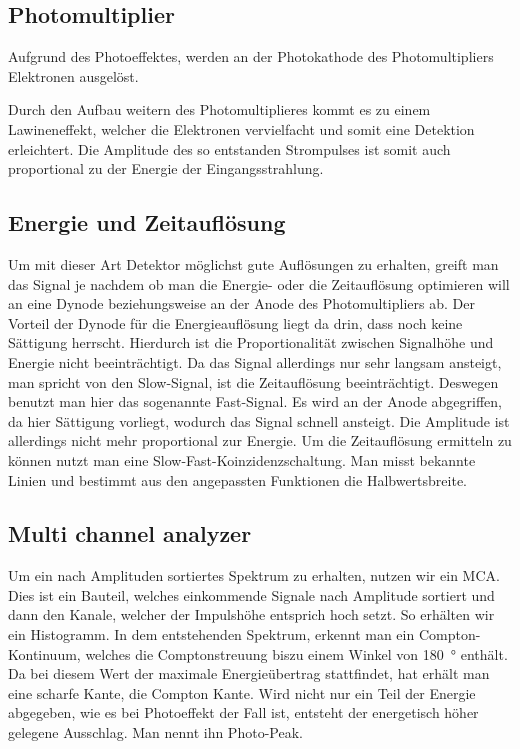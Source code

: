\documentclass[11pt, ngerman, fleqn, DIV=15, headinclude, BCOR=2cm]{scrreprt}
\begin{document}
\subsection{Photomultiplier}
Aufgrund des Photoeffektes, werden an der Photokathode des Photomultipliers
Elektronen ausgelöst.

Durch den Aufbau weitern des Photomultiplieres kommt es zu einem Lawineneffekt,
welcher die Elektronen vervielfacht und somit eine Detektion erleichtert.
Die Amplitude des so entstanden Strompulses ist somit auch proportional zu der
Energie der Eingangsstrahlung.

\subsection{Energie und Zeitauflösung}
Um mit dieser Art Detektor möglichst gute Auflösungen zu erhalten, greift man
das Signal je nachdem ob man die Energie- oder die Zeitauflösung optimieren will
an eine Dynode beziehungsweise an der Anode des Photomultipliers ab.
Der Vorteil der Dynode für die Energieauflösung liegt da drin, dass noch keine
Sättigung herrscht. Hierdurch ist die Proportionalität zwischen Signalhöhe und
Energie nicht beeinträchtigt. Da das Signal allerdings nur sehr langsam
ansteigt, man spricht von den Slow-Signal, ist die Zeitauflösung beeinträchtigt.
Deswegen benutzt man hier das sogenannte Fast-Signal. Es wird an der Anode
abgegriffen, da hier Sättigung vorliegt, wodurch das Signal schnell ansteigt.
Die Amplitude ist allerdings nicht mehr proportional zur Energie.
Um die Zeitauflösung ermitteln zu können nutzt man eine
Slow-Fast-Koinzidenzschaltung. Man misst bekannte Linien und bestimmt aus den
angepassten Funktionen die Halbwertsbreite.


\subsection{Multi channel analyzer}
Um ein nach Amplituden sortiertes Spektrum zu erhalten, nutzen wir ein MCA.
Dies ist ein Bauteil, welches einkommende Signale nach Amplitude sortiert und
dann den Kanale, welcher der Impulshöhe entsprich hoch setzt. So erhälten wir ein
Histogramm.
In dem entstehenden Spektrum, erkennt man ein Compton-Kontinuum, welches die 
Comptonstreuung biszu einem Winkel von \SI{180}{\degree} enthält. Da bei diesem
Wert der maximale Energieübertrag stattfindet, hat erhält man eine scharfe Kante, 
die Compton Kante. Wird nicht nur ein Teil der Energie abgegeben, wie es bei 
Photoeffekt der Fall ist, entsteht der energetisch höher gelegene Ausschlag. Man 
nennt ihn Photo-Peak.
\end{document}
